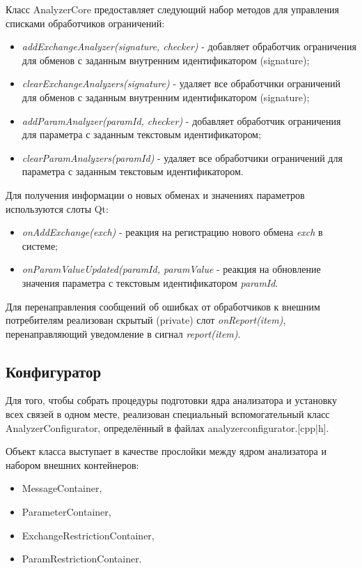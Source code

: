 Класс AnalyzerCore предоставляет следующий набор методов для управления 
списками обработчиков ограничений:

\begin{itemize}
 \item \textit{addExchangeAnalyzer(signature, checker)} - добавляет 
обработчик ограничения для обменов с заданным внутренним идентификатором 
(signature);
 \item \textit{clearExchangeAnalyzers(signature)} - удаляет все обработчики 
ограничений для обменов с заданным внутренним идентификатором (signature);
 \item \textit{addParamAnalyzer(paramId, checker)} - добавляет обработчик 
ограничения для параметра с заданным текстовым идентификатором;
 \item \textit{clearParamAnalyzers(paramId)} - удаляет все обработчики 
ограничений для параметра с заданным текстовым идентификатором.
\end{itemize}

Для получения информации о новых обменах и значениях параметров используются 
слоты Qt:

\begin{itemize}
 \item \textit{onAddExchange(exch)} - реакция на регистрацию нового обмена 
\textit{exch} в системе;
 \item \textit{onParamValueUpdated(paramId, paramValue} - реакция на обновление 
значения параметра с текстовым идентификатором \textit{paramId}.
\end{itemize}

Для перенаправления сообщений об ошибках от обработчиков к внешним потребителям 
реализован скрытый (private) слот \textit{onReport(item)}, перенаправляющий 
уведомление в сигнал \textit{report(item)}.

\subsection{Конфигуратор}

Для того, чтобы собрать процедуры подготовки ядра анализатора и установку всех 
связей в одном месте, реализован специальный вспомогательный класс 
AnalyzerConfigurator, определённый в файлах analyzerconfigurator.[cpp|h]. 

Объект класса выступает в качестве прослойки между ядром анализатора 
и набором внешних контейнеров:

\begin{itemize}
 \item MessageContainer,
 \item ParameterContainer,
 \item ExchangeRestrictionContainer,
 \item ParamRestrictionContainer.
\end{itemize}

